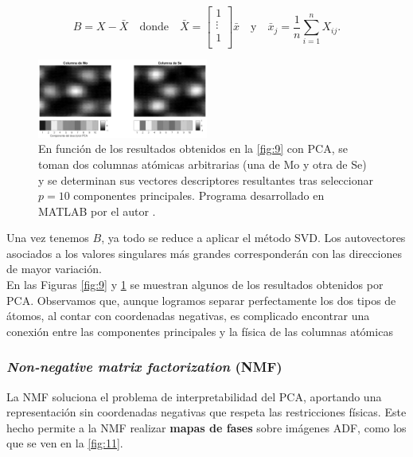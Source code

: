 \begin{equation}
    B = X - \bar X \quad \text{donde} \quad
    \bar X = 
    \begin{bmatrix}
    1        \\
    \vdots   \\
    1        \\
    \end{bmatrix} \bar x \quad \text{y} \quad
    \bar x_j = \frac{1}{n} \sum^n_{i=1} X_{ij}.
\end{equation}

\begin{figure}
    \centering
    \includegraphics[width=0.5\textwidth]{fig/Fig10.png}
    \caption{En función de los resultados obtenidos en la \autoref{fig:9} con PCA, se toman dos columnas atómicas arbitrarias (una de Mo y otra de Se) y se determinan sus vectores descriptores resultantes tras seleccionar $p = 10$ componentes principales. Programa desarrollado en MATLAB por el autor \cite{repo}.}
    \label{fig:10}
\end{figure} 

Una vez tenemos $B$, ya todo se reduce a aplicar el método SVD. Los autovectores asociados a los valores singulares más grandes corresponderán con las direcciones de mayor variación.\\



En las Figuras \ref{fig:9} y \ref{fig:10} se muestran algunos de los resultados obtenidos por PCA. Observamos que, aunque logramos separar perfectamente los dos tipos de átomos, al contar con coordenadas negativas, es complicado encontrar una conexión entre las componentes principales y la física de las columnas atómicas


\subsubsection{\textit{Non-negative matrix factorization} (NMF)}

La NMF soluciona el problema de interpretabilidad del PCA, aportando una representación sin coordenadas negativas que respeta las restricciones físicas. Este hecho permite a la NMF realizar \textbf{mapas de fases} sobre imágenes ADF, como los que se ven en la \autoref{fig:11}.\\

